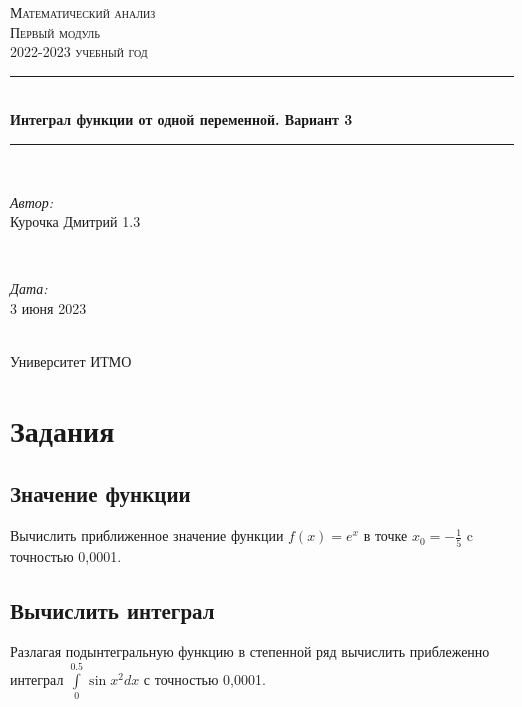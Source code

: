 \documentclass{article}
\begin{document}
\begin{titlepage}
    \centering
    \vspace*{0.5 cm}
    \textsc{\LARGE Математический анализ}\\[1.0 cm]
    \textsc{\Large Первый модуль}\\[0.5 cm]
    \textsc{\large 2022-2023 учебный год}\\[1.5 cm]
    \rule{\linewidth}{0.1 mm} \\[0.4 cm]
    { \huge \bfseries Интеграл функции от одной переменной. Вариант 3}\\[0.2 cm]
    \rule{\linewidth}{0.1 mm} \\[2 cm]
    \begin{minipage}{0.6\textwidth}
        \begin{flushleft} \large
            \emph{Автор:}\\
            Курочка Дмитрий 1.3
        \end{flushleft}
    \end{minipage}~
    \begin{minipage}{0.4\textwidth}
        \begin{flushright} \large
            \emph{Дата:} \\
            3 июня 2023
        \end{flushright}
    \end{minipage}\\[2 cm]
    {\large Университет ИТМО}\\[2 cm]
    \vfill
\end{titlepage}

\renewcommand{\contentsname}{Содержимое}
\tableofcontents
\newpage


\section{Задания}

\subsection{Значение функции}

Вычислить приближенное значение функции $f(x) = e^x$ в точке $x_0 = -\frac{1}{5}$ c точностью 0,0001.

\subsection{Вычислить интеграл}

Разлагая подынтегральную функцию в степенной ряд вычислить приблеженно интеграл $\int\limits_{0}^{0.5} \sin{x^2}dx$ с точностью 0,0001.
\end{document}
